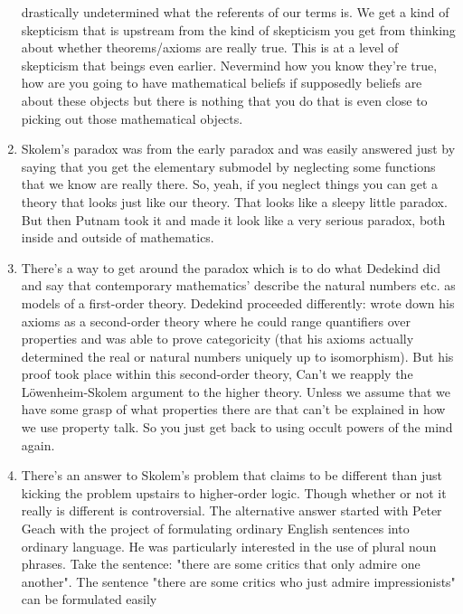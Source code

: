 \documentclass[12pt]{article}
\theoremstyle{definition}
\begin{document}
\begin{enumerate}
        drastically undetermined what the referents of our terms is. We get a
        kind of skepticism that is upstream from the kind of skepticism you get
        from thinking about whether theorems/axioms are really true.  This is
        at a level of skepticism that beings even earlier. Nevermind how you
        know they're true, how are you going to have mathematical beliefs if
        supposedly beliefs are about these objects but there is nothing that
        you do that is even close to picking out those mathematical objects.
    \item
        Skolem's paradox was from the early paradox and was easily answered
        just by saying that you get the elementary submodel by neglecting some
        functions that we know are really there. So, yeah, if you neglect
        things you can get a theory that looks just like our theory. That looks
        like a sleepy little paradox. But then Putnam took it and made it look
        like a very serious paradox, both inside and outside of mathematics.
    \item
        There's a way to get around the paradox which is to do what Dedekind
        did and say that contemporary mathematics' describe the natural numbers
        etc. as models of a first-order theory. Dedekind proceeded differently:
        wrote down his axioms as a second-order theory where he could range
        quantifiers over properties and was able to prove categoricity (that
        his axioms actually determined the real or natural numbers uniquely up
        to isomorphism). But his proof took place within this second-order
        theory, Can't we reapply the L\"owenheim-Skolem argument to the higher
        theory. Unless we assume that we have some grasp of what properties
        there are that can't be explained in how we use property talk. So you
        just get back to using occult powers of the mind again. 
    \item
        There's an answer to Skolem's problem that claims to be different than
        just kicking the problem upstairs to higher-order logic. Though whether
        or not it really is different is controversial. The alternative answer
        started with Peter Geach with the project of formulating ordinary
        English sentences into ordinary language. He was particularly
        interested in the use of plural noun phrases. Take the sentence: "there
        are some critics that only admire one another". The sentence "there are
        some critics who just admire impressionists" can be formulated easily

\end{enumerate}
\end{document}
